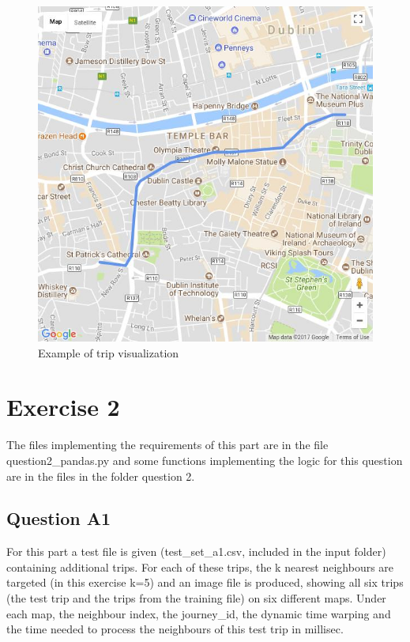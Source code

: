 \documentclass[12pt]{article}
\begin{document}
	\begin{figure} [H]
		\begin{center}
			\includegraphics [scale = 0.75] {questionCexample.jpg}
			\caption{Example of trip visualization}
		\end{center}
	\end{figure} 
	
	\section{Exercise 2}
	The files implementing the requirements of this part are in the file question2\_pandas.py and some functions implementing the logic for this question are in the files in the folder question 2.
	
	\subsection{Question A1}
	For this part a test file is given (test\_set\_a1.csv, included in the input folder) containing additional trips. For each of these trips, the k nearest neighbours are targeted (in this exercise k=5) and an image file is produced, showing all six trips (the test trip and the trips from the training file) on six different maps. Under each map, the neighbour index, the journey\_id, the dynamic time warping and the time needed to process the neighbours of this test trip in millisec.
	
\end{document}
